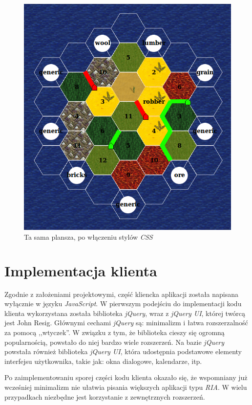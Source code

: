 \documentclass[a4paper,12pt]{article}
\begin{document}
\begin{figure}[ht]
  \begin{center}
    \includegraphics[width=\linewidth]{board.png}
  \end{center}
  \caption{Ta sama plansza, po włączeniu stylów \emph{CSS}}
  \label{fig:board}
\end{figure}

\clearpage

\section{Implementacja klienta}

Zgodnie z założeniami projektowymi, część kliencka aplikacji została
napisana wyłącznie w języku \emph{JavaScript}. W pierwszym podejściu
do implementacji kodu klienta wykorzystana została biblioteka
\emph{jQuery}, wraz z \emph{jQuery UI}, której twórcą jest John
Resig. Głównymi cechami \emph{jQuery} są: minimalizm i łatwa
rozszerzalność za pomocą ,,wtyczek''. W związku z tym, że biblioteka
cieszy się ogromną popularnością, powstało do niej bardzo wiele
rozszerzeń. Na bazie \emph{jQuery} powstała również biblioteka
\emph{jQuery UI}, która udostępnia podstawowe elementy interfejsu
użytkownika, takie jak: okna dialogowe, kalendarze, itp.

Po zaimplementowaniu sporej części kodu klienta okazało się, że
wspomniany już wcześniej minimalizm nie ułatwia pisania większych
aplikacji typu \emph{RIA}. W wielu przypadkach niezbędne jest
korzystanie z zewnętrznych rozszerzeń.


\clearpage



\end{document}
